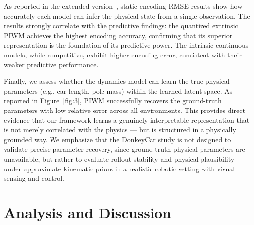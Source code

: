 \documentclass[nonacm,sigconf]{acmart}
\begin{document}
As reported in the extended version~\cite{extended}, static encoding RMSE results show how accurately each model can infer the physical state from a single observation. The results strongly correlate with the predictive findings: the quantized extrinsic PIWM achieves the highest encoding accuracy, confirming that its superior representation is the foundation of its predictive power. The intrinsic continuous models, while competitive, exhibit higher encoding error, consistent with their weaker predictive performance.

Finally, we assess whether the dynamics model can learn the true physical parameters (e.g., car length, pole mass) within the learned latent space. As reported in Figure~\ref{fig:3}, PIWM successfully recovers the ground-truth parameters with low relative error across all environments. This provides direct evidence that our framework learns a genuinely interpretable representation that is not merely correlated with the physics --- but is structured in a physically grounded way. We emphasize that the DonkeyCar study is not designed to validate precise parameter recovery, since ground-truth physical parameters are unavailable, but rather to evaluate rollout stability and physical plausibility under approximate kinematic priors in a realistic robotic setting with visual sensing and control.









\section{Analysis and Discussion}\label{sec:dis}
\end{document}
